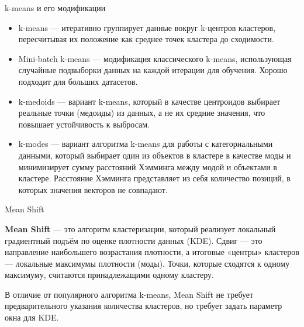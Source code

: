 \documentclass[unicode, notheorems, handout]{beamer}
\begin{document}
\begin{frame}{k-means и его модификации}
\small
\begin{itemize}
    \item k-means --- итеративно группирует данные вокруг k-центров кластеров, пересчитывая их положение как среднее точек кластера до сходимости.

    \item Mini-batch k-means --- модификация классического k-means, использующая случайные подвыборки данных на каждой итерации для обучения. Хорошо подходит для больших датасетов.

    \item k-medoids --- вариант k-means, который в качестве центроидов выбирает реальные точки (медоиды) из данных, а не их средние значения, что повышает устойчивость к выбросам.

    \item k-modes --- вариант алгоритма k-means для работы с категориальными данными, который выбирает один из объектов в кластере в качестве моды и минимизирует сумму расстояний Хэмминга между модой и объектами в кластере. Расстояние Хэмминга представляет из себя количество позиций, в которых значения векторов не совпадают.
\end{itemize}
\end{frame}


\begin{frame}{Mean Shift}

\textbf{Mean Shift} --- это алгоритм кластеризации, 
который реализует локальный градиентный подъём по оценке плотности данных (KDE). Сдвиг --- это направление наибольшего возрастания плотности, а итоговые «центры» кластеров --- локальные максимумы плотности (моды). Точки, которые сходятся к одному максимуму, считаются принадлежащими одному кластеру.
\vspace{1ex}

В отличие от популярного алгоритма k-means, Mean Shift не требует предварительного указания количества кластеров, но требует задать параметр окна для KDE.
\end{frame}



\end{document}
